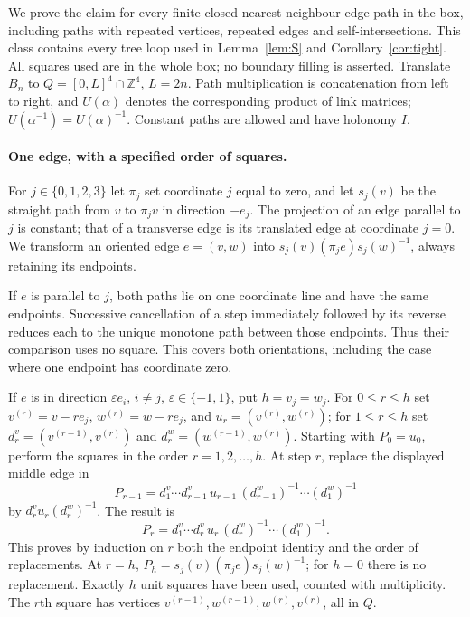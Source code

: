 \documentclass[11pt,a4paper]{article}
\theoremstyle{plain}
\theoremstyle{definition}
\theoremstyle{remark}
\numberwithin{equation}{section}
\newcommand{\Z}{\mathbb{Z}}
\begin{document}
We prove the claim for every finite closed nearest-neighbour edge path in the box, including paths with repeated vertices,
repeated edges and self-intersections. This class contains every tree loop used in Lemma~\ref{lem:S} and
Corollary~\ref{cor:tight}. All squares used are in the whole box; no boundary filling is asserted.
Translate $B_n$ to $Q=[0,L]^4\cap\Z^4$, $L=2n$. Path multiplication is concatenation from left to right, and
$U(\alpha)$ denotes the corresponding product of link matrices; $U(\alpha^{-1})=U(\alpha)^{-1}$.
Constant paths are allowed and have holonomy $I$.

\paragraph{One edge, with a specified order of squares.}
For $j\in\{0,1,2,3\}$ let $\pi_j$ set coordinate $j$ equal to zero, and let $s_j(v)$ be the straight path from $v$ to $\pi_jv$
in direction $-e_j$. The projection of an edge parallel to $j$ is constant; that of a transverse edge is its translated edge
at coordinate $j=0$. We transform an oriented edge $e=(v,w)$ into
$s_j(v)(\pi_je)s_j(w)^{-1}$, always retaining its endpoints.

If $e$ is parallel to $j$, both paths lie on one coordinate line and have the same endpoints.
Successive cancellation of a step immediately followed by its reverse reduces each to the unique monotone path between those
endpoints. Thus their comparison uses no square. This covers both orientations, including the case where one endpoint has coordinate zero.

If $e$ is in direction $\varepsilon e_i$, $i\ne j$, $\varepsilon\in\{-1,1\}$, put $h=v_j=w_j$.
For $0\le r\le h$ set $v^{(r)}=v-re_j$, $w^{(r)}=w-re_j$, and
$u_r=(v^{(r)},w^{(r)})$; for $1\le r\le h$ set
$d_r^v=(v^{(r-1)},v^{(r)})$ and $d_r^w=(w^{(r-1)},w^{(r)})$.
Starting with $P_0=u_0$, perform the squares in the order $r=1,2,\ldots,h$.
At step $r$, replace the displayed middle edge in
\[
P_{r-1}=d_1^v\cdots d_{r-1}^v\,u_{r-1}\,(d_{r-1}^w)^{-1}\cdots(d_1^w)^{-1}
\]
by $d_r^v u_r(d_r^w)^{-1}$. The result is
\[
P_r=d_1^v\cdots d_r^v\,u_r\,(d_r^w)^{-1}\cdots(d_1^w)^{-1}.
\]
This proves by induction on $r$ both the endpoint identity and the order of replacements.
At $r=h$, $P_h=s_j(v)(\pi_je)s_j(w)^{-1}$; for $h=0$ there is no replacement.
Exactly $h$ unit squares have been used, counted with multiplicity.
The $r$th square has vertices $v^{(r-1)},w^{(r-1)},w^{(r)},v^{(r)}$, all in $Q$.
\end{document}
